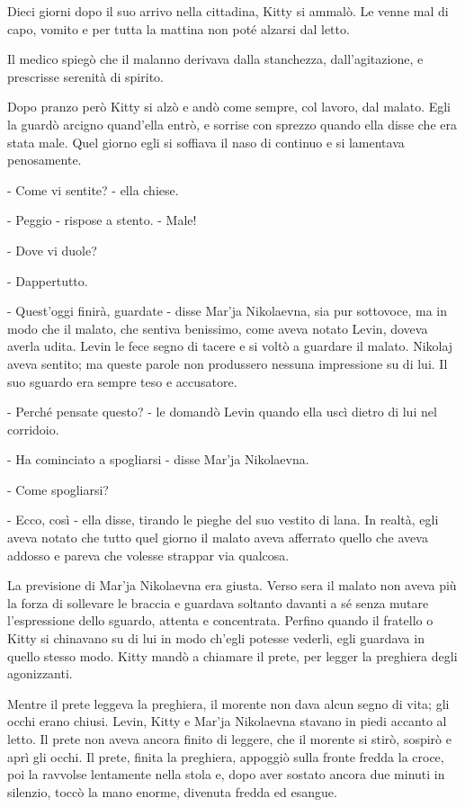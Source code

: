 Dieci giorni dopo il suo arrivo nella cittadina, Kitty si ammalò. Le venne mal di capo, vomito e per tutta la mattina non poté alzarsi dal letto. 

Il medico spiegò che il malanno derivava dalla stanchezza, dall'agitazione, e prescrisse serenità di spirito. 

Dopo pranzo però Kitty si alzò e andò come sempre, col lavoro, dal malato. Egli la guardò arcigno quand'ella entrò, e sorrise con sprezzo quando ella disse che era stata male. Quel giorno egli si soffiava il naso di continuo e si lamentava penosamente. 

- Come vi sentite? - ella chiese. 

- Peggio - rispose a stento. - Male! 

- Dove vi duole? 

- Dappertutto. 

- Quest'oggi finirà, guardate - disse Mar'ja Nikolaevna, sia pur sottovoce, ma in modo che il malato, che sentiva benissimo, come aveva notato Levin, doveva averla udita. Levin le fece segno di tacere e si voltò a guardare il malato. Nikolaj aveva sentito; ma queste parole non produssero nessuna impressione su di lui. Il suo sguardo era sempre teso e accusatore. 

- Perché pensate questo? - le domandò Levin quando ella uscì dietro di lui nel corridoio. 

- Ha cominciato a spogliarsi - disse Mar'ja Nikolaevna. 

- Come spogliarsi? 

- Ecco, così - ella disse, tirando le pieghe del suo vestito di lana. In realtà, egli aveva notato che tutto quel giorno il malato aveva afferrato quello che aveva addosso e pareva che volesse strappar via qualcosa. 

La previsione di Mar'ja Nikolaevna era giusta. Verso sera il malato non aveva più la forza di sollevare le braccia e guardava soltanto davanti a sé senza mutare l'espressione dello sguardo, attenta e concentrata. Perfino quando il fratello o Kitty si chinavano su di lui in modo ch'egli potesse vederli, egli guardava in quello stesso modo. Kitty mandò a chiamare il prete, per legger la preghiera degli agonizzanti. 

Mentre il prete leggeva la preghiera, il morente non dava alcun segno di vita; gli occhi erano chiusi. Levin, Kitty e Mar'ja Nikolaevna stavano in piedi accanto al letto. Il prete non aveva ancora finito di leggere, che il morente si stirò, sospirò e aprì gli occhi. Il prete, finita la preghiera, appoggiò sulla fronte fredda la croce, poi la ravvolse lentamente nella stola e, dopo aver sostato ancora due minuti in silenzio, toccò la mano enorme, divenuta fredda ed esangue. 

